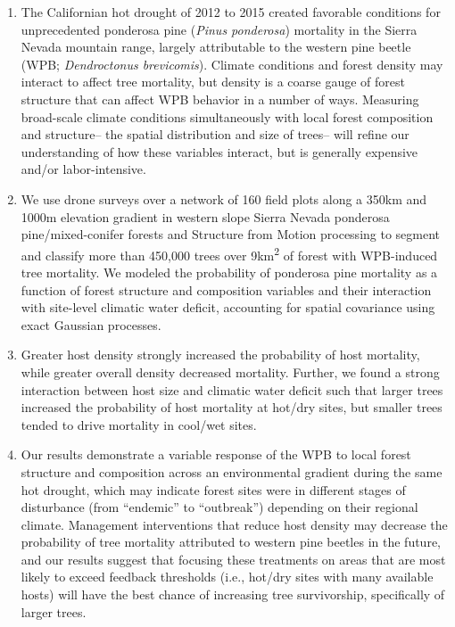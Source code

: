 \documentclass[]{article}
\begin{document}
\begin{enumerate}
\def\labelenumi{\arabic{enumi}.}
\item
  The Californian hot drought of 2012 to 2015 created favorable
  conditions for unprecedented ponderosa pine (\emph{Pinus ponderosa})
  mortality in the Sierra Nevada mountain range, largely attributable to
  the western pine beetle (WPB; \emph{Dendroctonus brevicomis}). Climate
  conditions and forest density may interact to affect tree mortality,
  but density is a coarse gauge of forest structure that can affect WPB
  behavior in a number of ways. Measuring broad-scale climate conditions
  simultaneously with local forest composition and structure-- the
  spatial distribution and size of trees-- will refine our understanding
  of how these variables interact, but is generally expensive and/or
  labor-intensive.
\item
  We use drone surveys over a network of 160 field plots along a 350km
  and 1000m elevation gradient in western slope Sierra Nevada ponderosa
  pine/mixed-conifer forests and Structure from Motion processing to
  segment and classify more than 450,000 trees over
  9km\textsuperscript{2} of forest with WPB-induced tree mortality. We
  modeled the probability of ponderosa pine mortality as a function of
  forest structure and composition variables and their interaction with
  site-level climatic water deficit, accounting for spatial covariance
  using exact Gaussian processes.
\item
  Greater host density strongly increased the probability of host
  mortality, while greater overall density decreased mortality. Further,
  we found a strong interaction between host size and climatic water
  deficit such that larger trees increased the probability of host
  mortality at hot/dry sites, but smaller trees tended to drive
  mortality in cool/wet sites.
\item
  Our results demonstrate a variable response of the WPB to local forest
  structure and composition across an environmental gradient during the
  same hot drought, which may indicate forest sites were in different
  stages of disturbance (from ``endemic'' to ``outbreak'') depending on
  their regional climate. Management interventions that reduce host
  density may decrease the probability of tree mortality attributed to
  western pine beetles in the future, and our results suggest that
  focusing these treatments on areas that are most likely to exceed
  feedback thresholds (i.e., hot/dry sites with many available hosts)
  will have the best chance of increasing tree survivorship,
  specifically of larger trees.
\end{enumerate}
\end{document}
